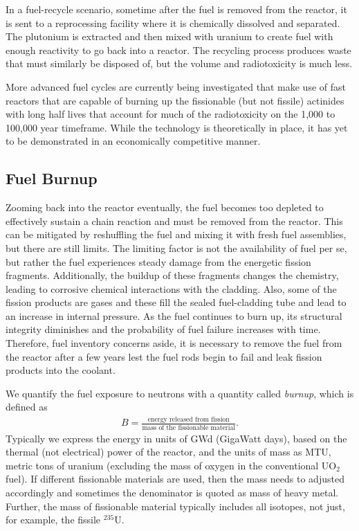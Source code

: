 In a fuel-recycle scenario, sometime after the fuel is removed from the reactor, it is sent to a reprocessing facility where it is chemically dissolved and separated. The plutonium is extracted and then mixed with uranium to create fuel with enough reactivity to go back into a reactor. The recycling process produces waste that must similarly be disposed of, but the volume and radiotoxicity is much less. 

More advanced fuel cycles are currently being investigated that make use of fast reactors that are capable of burning up the fissionable (but not fissile) actinides with long half lives that account for much of the radiotoxicity on the 1,000 to 100,000 year timeframe. While the technology is theoretically in place, it has yet to be demonstrated in an economically competitive manner.

\subsection{Fuel Burnup}

Zooming back into the reactor eventually, the fuel becomes too depleted to effectively sustain a chain reaction and must be removed from the reactor. This can be mitigated by reshuffling the fuel and mixing it with fresh fuel assemblies, but there are still limits. The limiting factor is not the availability of fuel per se, but rather the fuel experiences steady damage from the energetic fission fragments. Additionally, the buildup of these fragments changes the chemistry, leading to corrosive chemical interactions with the cladding. Also, some of the fission products are gases and these fill the sealed fuel-cladding tube and lead to an increase in internal pressure. As the fuel continues to burn up, its structural integrity diminishes and the probability of fuel failure increases with time. Therefore, fuel inventory concerns aside, it is necessary to remove the fuel from the reactor after a few years lest the fuel rods begin to fail and leak fission products into the coolant.

We quantify the fuel exposure to neutrons with a quantity called \emph{burnup}, which is defined as
\begin{align}
  B = \frac{\text{energy released from fission}}{\text{mass of the fissionable material}} .
\end{align}
Typically we express the energy in units of GWd (GigaWatt days), based on the thermal (not electrical) power of the reactor, and the units of mass as MTU, metric tons of uranium (excluding the mass of oxygen in the conventional UO$_2$ fuel). If different fissionable materials are used, then the mass needs to adjusted accordingly and sometimes the denominator is quoted as mass of heavy metal. Further, the mass of fissionable material typically includes all isotopes, not just, for example, the fissile $^{235}$U.

